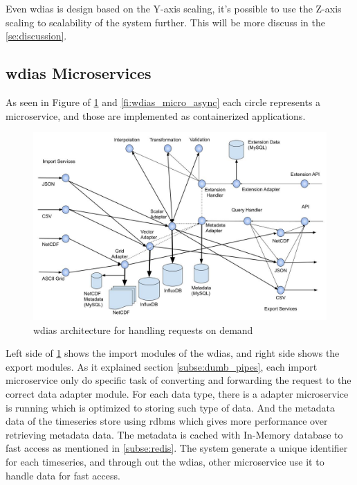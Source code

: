 Even \acrshort{wdias} is design based on the Y-axis scaling, it's possible to use the Z-axis scaling to scalability of the system further. This will be more discuss in the \cref{se:discussion}.




\subsection{\acrshort{wdias} Microservices}
\label{sebse:wdias_microservices}
As seen in Figure of \cref{fi:wdias_micro_on_demand} and \cref{fi:wdias_micro_async} each circle represents a microservice, and those are implemented as containerized applications.
\begin{figure}[htp]
    \centering
    \includegraphics[width=1\textwidth]{method/microservice/microservice_architecture-handle_on_demand-v3.jpg}
    \caption{\acrshort{wdias} architecture for handling requests on demand}
    \label{fi:wdias_micro_on_demand}
\end{figure}
Left side of \cref{fi:wdias_micro_on_demand} shows the import modules of the \acrshort{wdias}, and right side shows the export modules. As it explained section \cref{subse:dumb_pipes}, each import microservice only do specific task of converting and forwarding the request to the correct data adapter module.
For each data type, there is a adapter microservice is running which is optimized to storing such type of data. And the metadata data of the timeseries store using \acrshort{rdbms} which gives more performance over retrieving metadata data. The metadata is cached with In-Memory database to fast access as mentioned in \cref{subse:redis}.
The system generate a unique identifier for each timeseries, and through out the \acrshort{wdias}, other microservice use it to handle data for fast access.


